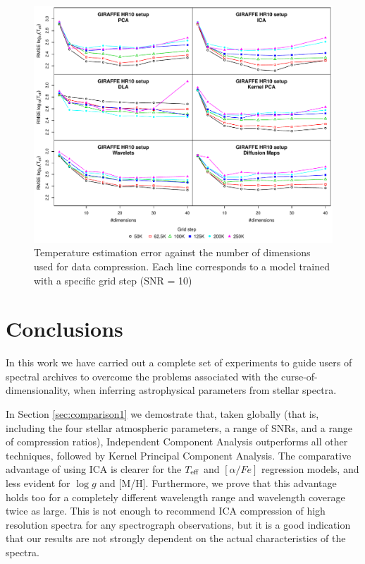 \documentclass[a4paper,fleqn,usenatbib]{mnras}
\begin{document}
{{{\begin{figure}
\centering\includegraphics[width=\textwidth]{bestSVM_Teff_N-RMSE_HR10_snr=10_all.pdf}
\caption{Temperature estimation error against the number of dimensions
  used for data compression. Each line corresponds to a model trained
  with a specific grid step (SNR = 10)}
\label{fig:grid10}
\end{figure}

\section{Conclusions}
\label{sec:conclusions}

In this work we have carried out a complete set of experiments to 
guide users of spectral archives to overcome the problems associated 
with the curse-of-dimensionality, when inferring 
astrophysical parameters from stellar spectra. 

In Section \ref{sec:comparison1} we demostrate that, taken globally 
(that is, including the four stellar atmospheric parameters, a 
range of SNRs, and a range of compression ratios),
Independent Component Analysis outperforms all other techniques, followed  
by Kernel Principal Component Analysis. The comparative advantage of 
using ICA is clearer for the $T_{\rm eff}$ and $\left[ \alpha/Fe \right]$ 
regression models, and less evident for $\log g$ and [M/H]. Furthermore, 
we prove that this advantage holds too for a completely different wavelength range 
and wavelength coverage twice as large. This is not enough to recommend 
ICA compression of high resolution spectra for any spectrograph observations, but it 
is a good indication that our results are not strongly dependent on the 
actual characteristics of the spectra. 

}}}
\end{document}
